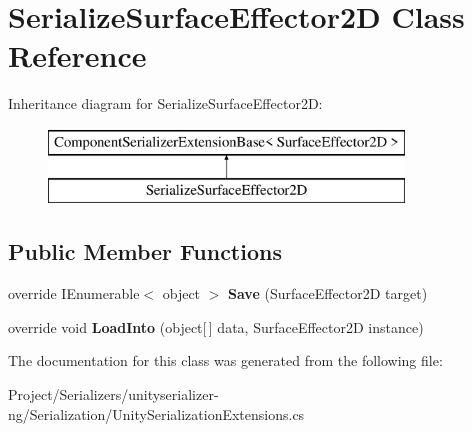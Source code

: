 \hypertarget{class_serialize_surface_effector2_d}{}\section{Serialize\+Surface\+Effector2D Class Reference}
\label{class_serialize_surface_effector2_d}
Inheritance diagram for Serialize\+Surface\+Effector2D\+:\begin{figure}[H]
\begin{center}
\leavevmode
\includegraphics[height=2.000000cm]{class_serialize_surface_effector2_d}
\end{center}
\end{figure}
\subsection*{Public Member Functions}
\begin{DoxyCompactItemize}
\item 
\mbox{\label{class_serialize_surface_effector2_d_a728f9886c7374a743c7316db50cda5ce}} 
override I\+Enumerable$<$ object $>$ {\bfseries Save} (Surface\+Effector2D target)
\item 
\mbox{\label{class_serialize_surface_effector2_d_a6f5729529ff455ccca0bd4e4956db6f9}} 
override void {\bfseries Load\+Into} (object\mbox{[}$\,$\mbox{]} data, Surface\+Effector2D instance)
\end{DoxyCompactItemize}


The documentation for this class was generated from the following file\+:\begin{DoxyCompactItemize}
\item 
Project/\+Serializers/unityserializer-\/ng/\+Serialization/Unity\+Serialization\+Extensions.\+cs\end{DoxyCompactItemize}
